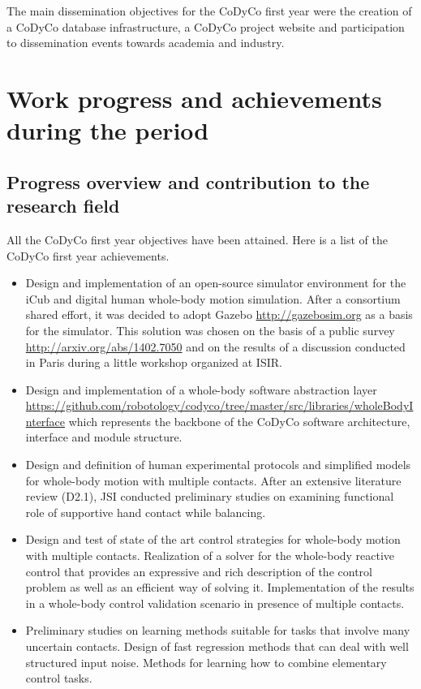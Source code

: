 \documentclass[12pt,a4paper,twoside]{article}
\begin{document}
The main dissemination objectives for the CoDyCo first year were the creation of a CoDyCo database infrastructure, a CoDyCo project website and participation to dissemination events towards academia and industry. 

\section{Work progress and achievements during the period}

\subsection{Progress overview and contribution to the research field}

All the CoDyCo first year objectives have been attained. Here is a list of the CoDyCo first year achievements. 
\begin{itemize}

\item Design and implementation of an open-source simulator environment for the iCub and digital human whole-body motion simulation. After a consortium shared effort, it was decided to adopt Gazebo \url{http://gazebosim.org} as a basis for the simulator. This solution was chosen on the basis of a public survey \url{http://arxiv.org/abs/1402.7050} and on the results of a discussion conducted in Paris during a little workshop organized at ISIR.

\item Design and implementation of a whole-body software abstraction layer \url{https://github.com/robotology/codyco/tree/master/src/libraries/wholeBodyInterface} which represents the backbone of the CoDyCo software architecture, interface and module structure.

\item Design and definition of human experimental protocols and simplified models for whole-body motion with multiple contacts. After an extensive literature review (D2.1), JSI conducted preliminary studies on examining functional role of supportive hand contact while balancing.

\item Design and test of state of the art control strategies for whole-body motion with multiple contacts. Realization of a solver for the whole-body reactive control that provides an expressive and rich description of the control problem as well as an efficient way of solving it. Implementation of the results in a whole-body control validation scenario in presence of multiple contacts. 

\item Preliminary studies on learning methods suitable for tasks that involve many uncertain contacts. Design of fast regression methods that can deal with well structured input noise. Methods for learning how to combine elementary control tasks.

\end{itemize}
\end{document}
